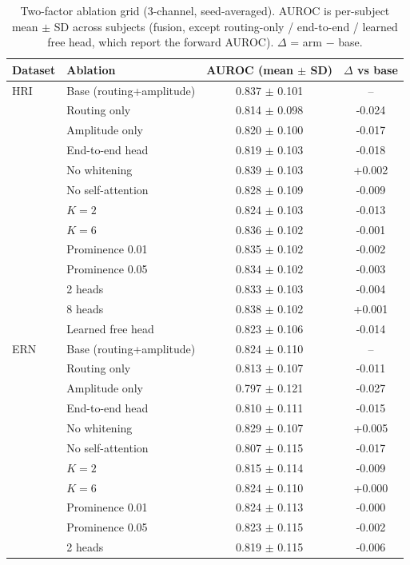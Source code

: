 \begin{table}[t]
\centering
\small
\setlength{\tabcolsep}{6pt}
\caption{Two-factor ablation grid (3-channel, seed-averaged). AUROC is per-subject mean $\pm$ SD across subjects (fusion, except routing-only / end-to-end / learned free head, which report the forward AUROC). $\Delta$ = arm $-$ base.}
\label{tab:ablation}
\begin{tabular}{llcc}
\toprule
Dataset & Ablation & AUROC (mean $\pm$ SD) & $\Delta$ vs base \\
\midrule
HRI & Base (routing+amplitude) & 0.837 $\pm$ 0.101 & -- \\
 & Routing only & 0.814 $\pm$ 0.098 & -0.024 \\
 & Amplitude only & 0.820 $\pm$ 0.100 & -0.017 \\
 & End-to-end head & 0.819 $\pm$ 0.103 & -0.018 \\
 & No whitening & 0.839 $\pm$ 0.103 & +0.002 \\
 & No self-attention & 0.828 $\pm$ 0.109 & -0.009 \\
 & $K=2$ & 0.824 $\pm$ 0.103 & -0.013 \\
 & $K=6$ & 0.836 $\pm$ 0.102 & -0.001 \\
 & Prominence 0.01 & 0.835 $\pm$ 0.102 & -0.002 \\
 & Prominence 0.05 & 0.834 $\pm$ 0.102 & -0.003 \\
 & 2 heads & 0.833 $\pm$ 0.103 & -0.004 \\
 & 8 heads & 0.838 $\pm$ 0.102 & +0.001 \\
 & Learned free head & 0.823 $\pm$ 0.106 & -0.014 \\
\midrule
ERN & Base (routing+amplitude) & 0.824 $\pm$ 0.110 & -- \\
 & Routing only & 0.813 $\pm$ 0.107 & -0.011 \\
 & Amplitude only & 0.797 $\pm$ 0.121 & -0.027 \\
 & End-to-end head & 0.810 $\pm$ 0.111 & -0.015 \\
 & No whitening & 0.829 $\pm$ 0.107 & +0.005 \\
 & No self-attention & 0.807 $\pm$ 0.115 & -0.017 \\
 & $K=2$ & 0.815 $\pm$ 0.114 & -0.009 \\
 & $K=6$ & 0.824 $\pm$ 0.110 & +0.000 \\
 & Prominence 0.01 & 0.824 $\pm$ 0.113 & -0.000 \\
 & Prominence 0.05 & 0.823 $\pm$ 0.115 & -0.002 \\
 & 2 heads & 0.819 $\pm$ 0.115 & -0.006 \\

\end{tabular}
\end{table}

